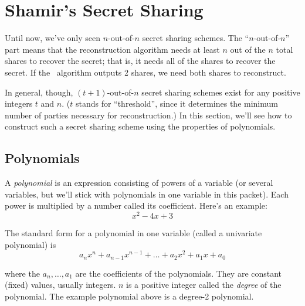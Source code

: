 \section{Shamir's Secret Sharing}

Until now, we've only seen $n$-out-of-$n$ secret sharing schemes. The ``$n$-out-of-$n$'' part means that 
the reconstruction algorithm needs at least $n$ out of the $n$ total shares to recover the
secret; that is, it needs all of the shares to recover the secret. If the 
\share~algorithm outputs 2 shares, we need both shares to reconstruct.

In general, though, $(t+1)$-out-of-$n$ secret sharing schemes exist for any positive integers
$t$ and $n$.
($t$ stands for ``threshold'', since it determines the minimum number of parties necessary 
for reconstruction.)
In this section, we'll see how to construct such a secret sharing scheme using the properties 
of polynomials.

\subsection{Polynomials}

A \emph{polynomial} is an expression consisting of powers of a variable (or several variables,
but we'll stick with polynomials in one variable in this packet). Each power 
is multiplied by a number called its coefficient. Here's an example:
\[
    x^2 - 4x + 3
\]

The standard form for a polynomial in one variable (called a univariate polynomial) is 
\begin{equation}\label{eqn:std-form}
    a_n x^n + a_{n-1} x^{n-1} + \ldots + a_2 x^2 + a_1 x + a_0
\end{equation}

where the $a_n, \ldots, a_1$ are the coefficients of the polynomials. They 
are constant (fixed) values, usually integers. $n$ 
is a positive integer called the \emph{degree} of the polynomial. The example polynomial
above is a degree-2 polynomial.

\begin{center}
\end{center}

